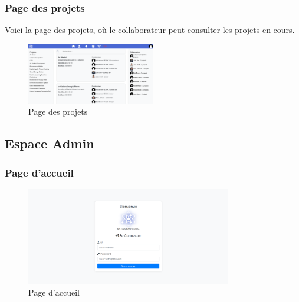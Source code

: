 \documentclass{article}
\begin{document}
            \subsubsection{Page des projets}
                Voici la page des projets, où le collaborateur peut consulter les projets en cours.
                \begin{figure}[h!]
                    \centering
                    \includegraphics[width=0.5\textwidth]{assets/webSite/projectsPage.png}
                    \caption{Page des projets}
                \end{figure}
                \FloatBarrier
        \subsection{Espace Admin}
                    \subsubsection{Page d'accueil}
                        \begin{figure}[h!]
                            \centering
                            \includegraphics[width=0.8\textwidth]{assets/webSite/loginAdmin.png}
                            \caption{Page d'accueil}
                        \end{figure}
                        \FloatBarrier
                        \newpage
\end{document}
